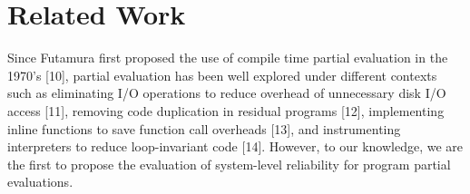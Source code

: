 \section{Related Work}

Since Futamura first proposed the use of compile time partial evaluation in the 1970’s [10], partial evaluation has been well explored under different contexts such as eliminating I/O operations to reduce overhead of unnecessary disk I/O access [11], removing code duplication in residual programs [12], implementing inline functions to save function call overheads [13], and instrumenting interpreters to reduce loop-invariant code [14].
However, to our knowledge, we are the first to propose the evaluation of system-level reliability for program partial evaluations.  
